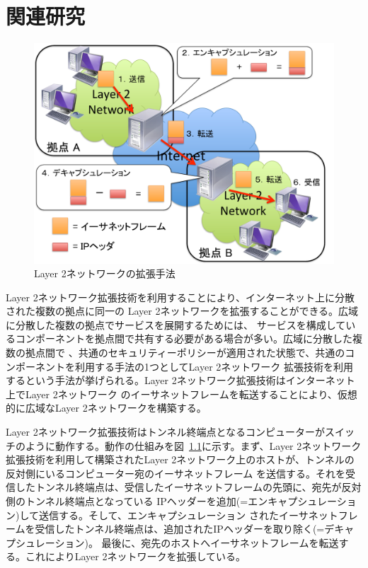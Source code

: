 \chapter{関連研究}
\label{rw}

\begin{figure}[h]
	\begin{center}
		\includegraphics[scale=0.50]{./img/l2tunnel}
		\caption{Layer 2ネットワークの拡張手法}
		\label{img:l2tunnel}
	\end{center}
\end{figure}

Layer 2ネットワーク拡張技術を利用することにより、インターネット上に分散された複数の拠点に同一の
Layer 2ネットワークを拡張することができる。広域に分散した複数の拠点でサービスを展開するためには、
サービスを構成しているコンポーネントを拠点間で共有する必要がある場合が多い。広域に分散した複数の拠点間で
、共通のセキュリティーポリシーが適用された状態で、共通のコンポーネントを利用する手法の1つとしてLayer 2ネットワーク
拡張技術を利用するという手法が挙げられる。Layer 2ネットワーク拡張技術はインターネット上でLayer 2ネットワーク
のイーサネットフレームを転送することにより、仮想的に広域なLayer 2ネットワークを構築する。

Layer 2ネットワーク拡張技術はトンネル終端点となるコンピューターがスイッチのように動作する。動作の仕組みを図~\ref{img:l2tunnel}に示す。まず、Layer 2ネットワーク
拡張技術を利用して構築されたLayer 2ネットワーク上のホストが、トンネルの反対側にいるコンピューター宛のイーサネットフレーム
を送信する。それを受信したトンネル終端点は、受信したイーサネットフレームの先頭に、宛先が反対側のトンネル終端点となっている
IPヘッダーを追加(=エンキャプシュレーション)して送信する。そして、エンキャプシュレーション
されたイーサネットフレームを受信したトンネル終端点は、追加されたIPヘッダーを取り除く(=デキャプシュレーション)。
最後に、宛先のホストへイーサネットフレームを転送する。これによりLayer 2ネットワークを拡張している。

